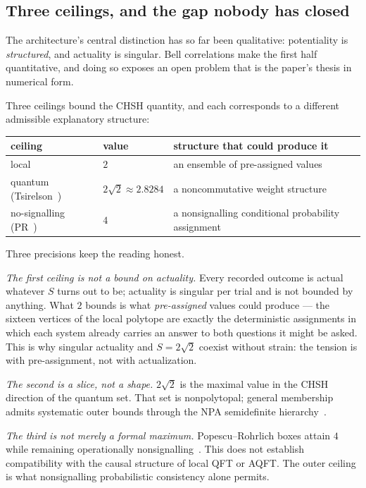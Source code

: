 \documentclass[11pt,a4paper]{article}
\theoremstyle{definition}
\theoremstyle{plain}
\theoremstyle{remark}
\begin{document}
\subsection{Three ceilings, and the gap nobody has closed}
\label{sec:tiers}

The architecture's central distinction has so far been qualitative:
potentiality is \emph{structured}, and actuality is singular. Bell
correlations make the first half quantitative, and doing so exposes an
open problem that is the paper's thesis in numerical form.

Three ceilings bound the CHSH quantity, and each corresponds to a
different admissible explanatory structure:

\begin{center}
\small
\begin{tabular}{@{}lll@{}}
\toprule
ceiling & value & structure that could produce it \\
\midrule
local & $2$ & an ensemble of pre-assigned values \\
quantum (Tsirelson~\cite{tsirelson}) & $2\sqrt2 \approx 2.8284$ & a noncommutative weight structure \\
no-signalling (PR~\cite{pr}) & $4$ & a nonsignalling conditional probability assignment \\
\bottomrule
\end{tabular}
\end{center}

Three precisions keep the reading honest.

\emph{The first ceiling is not a bound on actuality.} Every recorded
outcome is actual whatever $S$ turns out to be; actuality is singular per
trial and is not bounded by anything. What $2$ bounds is what
\emph{pre-assigned} values could produce --- the sixteen vertices of the
local polytope are exactly the deterministic assignments in which each
system already carries an answer to both questions it might be asked.
This is why singular actuality and $S = 2\sqrt2$ coexist without strain:
the tension is with pre-assignment, not with actualization.

\emph{The second is a slice, not a shape.} $2\sqrt2$ is the maximal value in the CHSH direction of
the quantum set. That set is nonpolytopal; general membership admits
systematic outer bounds through the NPA semidefinite
hierarchy~\cite{npa}.

\emph{The third is not merely a formal maximum.} Popescu--Rohrlich boxes
attain $4$ while remaining operationally nonsignalling~\cite{pr}.  This
does not establish compatibility with the causal structure of local QFT
or AQFT.  The outer ceiling is what nonsignalling probabilistic
consistency alone permits.
\end{document}
